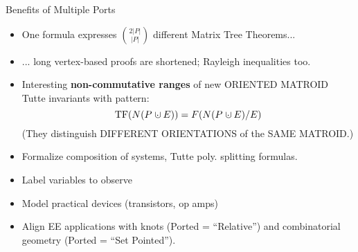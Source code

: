 \documentclass{article}
\newcommand{\dunion}
{\mbox{\hbox{\hskip0.45em$\cdot$\hskip-0.44em$\cup$\hskip0.2em}}}
\begin{document}
\begin{frame}{Benefits of Multiple Ports}

\begin{itemize}
\item One formula expresses $\binom{2|P|}{|P|}$ different Matrix Tree 
Theorems...
\item
... long vertex-based proofs are shortened; Rayleigh inequalities too.
\item
Interesting \textbf{non-commutative ranges} of
new ORIENTED MATROID Tutte invariants with pattern:
\[
\text{TF}(N(P\dunion E)) = F(N(P\dunion E)/E)
\]
(They distinguish DIFFERENT ORIENTATIONS of the SAME MATROID.)
\item
Formalize composition of systems\cite{NarayananDecompVS1986}, 
Tutte poly. splitting formulas.
\item
Label variables to observe
\item
Model practical devices (transistors, op amps)
\item 
Align EE applications with knots (Ported = ``Relative'')
and combinatorial geometry (Ported = ``Set Pointed'').  
\end{itemize}
\end{frame}
\end{document}
